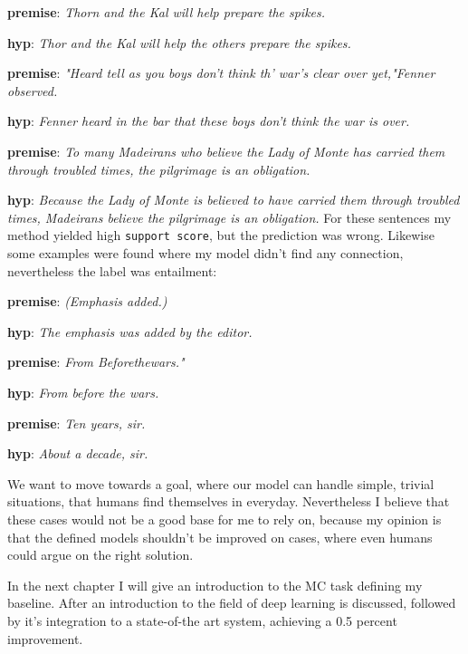 \textbf{premise}: \textit{Thorn and the Kal will help prepare the spikes.}

\textbf{hyp}: \textit{Thor and the Kal will help the others prepare the spikes. }
\newline

\textbf{premise}:  \textit{"Heard tell as you boys don't think th' war's clear over yet,"Fenner observed.}

\textbf{hyp}: \textit{Fenner heard in the bar that these boys don't think the war is over.}
\newline

\textbf{premise}: \textit{To many Madeirans who believe the Lady of Monte has carried them through troubled times, the pilgrimage is an obligation.}

\textbf{hyp}: \textit{Because the Lady of Monte is believed to have carried them through troubled times, Madeirans believe the pilgrimage is an obligation.}
\newline
For these sentences my method yielded high \texttt{support score}, but the prediction was wrong.
Likewise some examples were found where my model didn't find any connection, nevertheless the label was entailment:

\textbf{premise}: \textit{(Emphasis added.)}

\textbf{hyp}: \textit{The emphasis was added by the editor.}
\newline

\textbf{premise}: \textit{From Beforethewars."}

\textbf{hyp}: \textit{From before the wars.}
\newline

\textbf{premise}: \textit{Ten years, sir.}

\textbf{hyp}: \textit{About a decade, sir.}
\newline

We want to move towards a goal, where our model can handle simple, trivial situations, that humans find themselves in everyday. Nevertheless I believe that these cases would not be a good base for me to rely on, because my opinion is that the defined models shouldn't be improved on cases, where even humans could argue on the right solution.

In the next chapter I will give an introduction to the MC task defining my baseline. After an introduction to the field of deep learning is discussed, followed by it's integration to a state-of-the art system, achieving a 0.5 percent improvement.